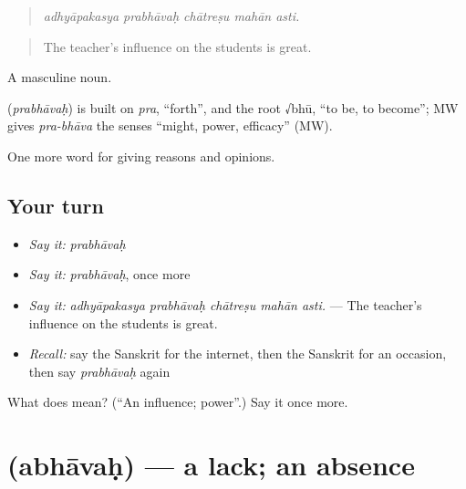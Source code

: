 \begin{quote}
    
\end{quote}

\begin{quote}
\emph{adhyāpakasya prabhāvaḥ chātreṣu mahān asti.}
\end{quote}

\begin{quote}
The teacher's influence on the students is great.
\end{quote}

A masculine noun.

\begin{cousinweb}
\textbf{} (\emph{prabhāvaḥ}) is built on \emph{pra}, \textquotedblleft{}forth\textquotedblright{}, and the root √bhū, \textquotedblleft{}to be, to become\textquotedblright{}; MW gives \emph{pra-bhāva} the senses \textquotedblleft{}might, power, efficacy\textquotedblright{} (MW).
\end{cousinweb}

\begin{grammarlens}[title={What you've built}]
One more word for giving reasons and opinions.
\end{grammarlens}

\subsection*{Your turn}
\begin{itemize}
\raggedright
  \item \emph{Say it:} \emph{prabhāvaḥ}
  \item \emph{Say it:} \emph{prabhāvaḥ}, once more
  \item \emph{Say it:} \emph{adhyāpakasya prabhāvaḥ chātreṣu mahān asti.} — The teacher's influence on the students is great.
  \item \emph{Recall:} say the Sanskrit for the internet, then the Sanskrit for an occasion, then say \emph{prabhāvaḥ} again
\end{itemize}

\begin{tcolorbox}[breakable,colback=teal!4,colframe=teal!35!black,title={Before you move on}]
What does  mean? (\textquotedblleft{}An influence; power\textquotedblright{}.) Say it once more.
\end{tcolorbox}
\section[\texorpdfstring{\sk{अभावः} (abhāvaḥ)}{अभावः (abhāvaḥ)}]{ (abhāvaḥ) — a lack; an absence}


